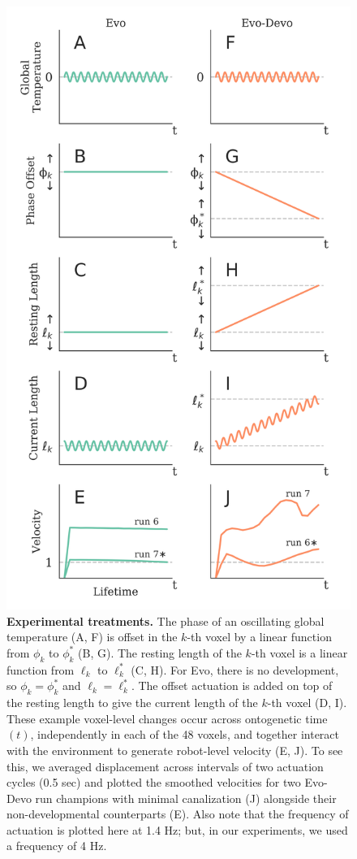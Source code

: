 \begin{figure}
\centering
\includegraphics[width=0.6\linewidth]{Chapter04/FigS2}
\caption{\label{fig:S2}\textbf{Experimental treatments.} The phase of an oscillating global temperature (A, F) is offset in the $k$-th voxel by a linear function from $\phi_k$ to $\phi_k^*$ (B, G). 
The resting length of the $k$-th voxel is a linear function from $\ell_k$ to $\ell_k^*$ (C, H). 
For Evo, there is no development, so $\phi_k=\phi_k^*$ and $\ell_k=\ell_k^*$.
The offset actuation is added on top of the resting length to give the current length of the $k$-th voxel (D, I). 
These example voxel-level changes occur across ontogenetic time $(t)$, independently in each of the 48 voxels, and together interact with the environment to generate robot-level velocity (E, J).
To see this, we averaged displacement across intervals of two actuation cycles (0.5 sec) and plotted the smoothed velocities for two Evo-Devo run champions with minimal canalization (J) alongside their non-developmental counterparts (E).
Also note that the frequency of actuation is plotted here at 1.4 Hz; but, in our experiments, we used a frequency of 4 Hz.
}
\end{figure}




